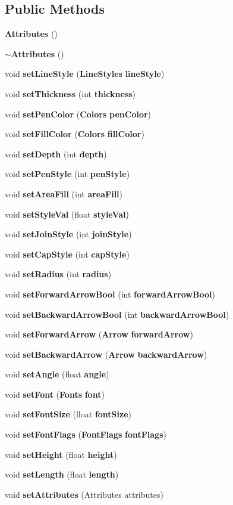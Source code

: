 \subsection*{Public Methods}
\begin{CompactItemize}
\item 
{\bf Attributes} ()
\item 
{\bf $\sim$Attributes} ()
\item 
void {\bf set\-Line\-Style} ({\bf Line\-Styles} {\bf line\-Style})
\item 
void {\bf set\-Thickness} (int {\bf thickness})
\item 
void {\bf set\-Pen\-Color} ({\bf Colors} {\bf pen\-Color})
\item 
void {\bf set\-Fill\-Color} ({\bf Colors} {\bf fill\-Color})
\item 
void {\bf set\-Depth} (int {\bf depth})
\item 
void {\bf set\-Pen\-Style} (int {\bf pen\-Style})
\item 
void {\bf set\-Area\-Fill} (int {\bf area\-Fill})
\item 
void {\bf set\-Style\-Val} (float {\bf style\-Val})
\item 
void {\bf set\-Join\-Style} (int {\bf join\-Style})
\item 
void {\bf set\-Cap\-Style} (int {\bf cap\-Style})
\item 
void {\bf set\-Radius} (int {\bf radius})
\item 
void {\bf set\-Forward\-Arrow\-Bool} (int {\bf forward\-Arrow\-Bool})
\item 
void {\bf set\-Backward\-Arrow\-Bool} (int {\bf backward\-Arrow\-Bool})
\item 
void {\bf set\-Forward\-Arrow} ({\bf Arrow} {\bf forward\-Arrow})
\item 
void {\bf set\-Backward\-Arrow} ({\bf Arrow} {\bf backward\-Arrow})
\item 
void {\bf set\-Angle} (float {\bf angle})
\item 
void {\bf set\-Font} ({\bf Fonts} {\bf font})
\item 
void {\bf set\-Font\-Size} (float {\bf font\-Size})
\item 
void {\bf set\-Font\-Flags} ({\bf Font\-Flags} {\bf font\-Flags})
\item 
void {\bf set\-Height} (float {\bf height})
\item 
void {\bf set\-Length} (float {\bf length})
\item 
void {\bf set\-Attributes} (Attributes attributes)

\end{CompactItemize}
